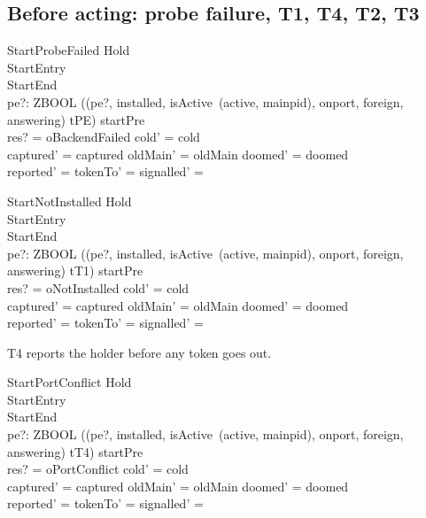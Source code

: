 \documentclass[a4paper,10pt,fleqn]{article}
\begin{document}
\subsection{Before acting: probe failure, T1, T4, T2, T3}

\begin{schema}{StartProbeFailed}
  Hold \\
  StartEntry \\
  StartEnd \\
  pe?: ZBOOL
\where
  ((pe?, installed, isActive~(active, mainpid), onport, foreign, answering) \mapsto tPE)
    \in startPre \\
  res? = oBackendFailed \land cold' = cold \\
  captured' = captured \land oldMain' = oldMain \land doomed' = doomed \\
  reported' = \emptyset \land tokenTo' = \emptyset \land
    signalled' = \emptyset
\end{schema}

\begin{schema}{StartNotInstalled}
  Hold \\
  StartEntry \\
  StartEnd \\
  pe?: ZBOOL
\where
  ((pe?, installed, isActive~(active, mainpid), onport, foreign, answering) \mapsto tT1)
    \in startPre \\
  res? = oNotInstalled \land cold' = cold \\
  captured' = captured \land oldMain' = oldMain \land doomed' = doomed \\
  reported' = \emptyset \land tokenTo' = \emptyset \land
    signalled' = \emptyset
\end{schema}

T4 reports the holder before any token goes out.

\begin{schema}{StartPortConflict}
  Hold \\
  StartEntry \\
  StartEnd \\
  pe?: ZBOOL
\where
  ((pe?, installed, isActive~(active, mainpid), onport, foreign, answering) \mapsto tT4)
    \in startPre \\
  res? = oPortConflict \land cold' = cold \\
  captured' = captured \land oldMain' = oldMain \land doomed' = doomed \\
  reported' = \emptyset \land tokenTo' = \emptyset \land
    signalled' = \emptyset
\end{schema}
\end{document}
